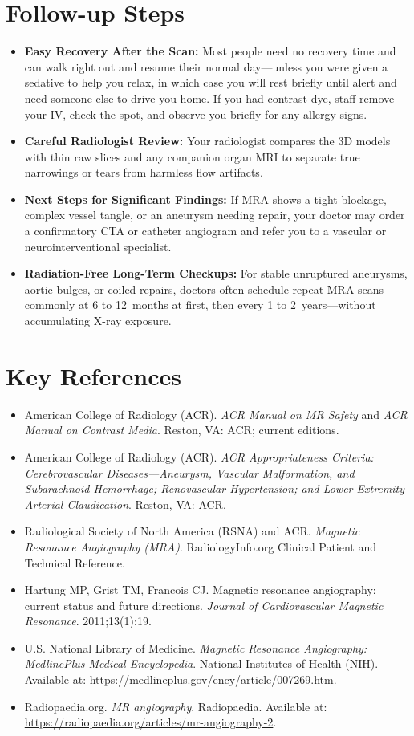 \section{Follow-up Steps}
\begin{itemize}
\item \textbf{Easy Recovery After the Scan:} Most people need no recovery time and can walk right out and resume their normal day---unless you were given a sedative to help you relax, in which case you will rest briefly until alert and need someone else to drive you home. If you had contrast dye, staff remove your IV, check the spot, and observe you briefly for any allergy signs.
\item \textbf{Careful Radiologist Review:} Your radiologist compares the 3D models with thin raw slices and any companion organ MRI to separate true narrowings or tears from harmless flow artifacts.
\item \textbf{Next Steps for Significant Findings:} If MRA shows a tight blockage, complex vessel tangle, or an aneurysm needing repair, your doctor may order a confirmatory CTA or catheter angiogram and refer you to a vascular or neurointerventional specialist.
\item \textbf{Radiation-Free Long-Term Checkups:} For stable unruptured aneurysms, aortic bulges, or coiled repairs, doctors often schedule repeat MRA scans---commonly at 6 to 12~months at first, then every 1 to 2~years---without accumulating X-ray exposure.
\end{itemize}

\section{Key References}
\begin{itemize}
\item American College of Radiology (ACR). \textit{ACR Manual on MR Safety} and \textit{ACR Manual on Contrast Media}. Reston, VA: ACR; current editions.
\item American College of Radiology (ACR). \textit{ACR Appropriateness Criteria: Cerebrovascular Diseases---Aneurysm, Vascular Malformation, and Subarachnoid Hemorrhage; Renovascular Hypertension; and Lower Extremity Arterial Claudication}. Reston, VA: ACR.
\item Radiological Society of North America (RSNA) and ACR. \textit{Magnetic Resonance Angiography (MRA)}. RadiologyInfo.org Clinical Patient and Technical Reference.
\item Hartung MP, Grist TM, Francois CJ. Magnetic resonance angiography: current status and future directions. \textit{Journal of Cardiovascular Magnetic Resonance}. 2011;13(1):19.
\item U.S. National Library of Medicine. \textit{Magnetic Resonance Angiography: MedlinePlus Medical Encyclopedia}. National Institutes of Health (NIH). Available at: \url{https://medlineplus.gov/ency/article/007269.htm}.
\item Radiopaedia.org. \textit{MR angiography}. Radiopaedia. Available at: \url{https://radiopaedia.org/articles/mr-angiography-2}.
\end{itemize}

